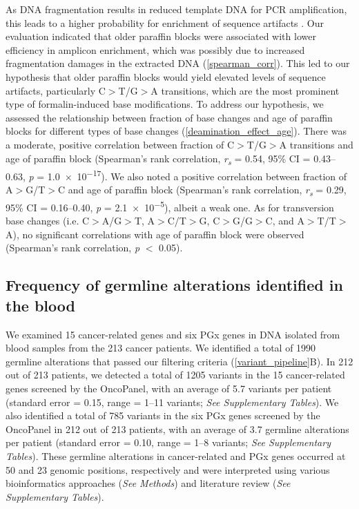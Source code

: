 \documentclass{bmcart}
\begin{document}
As DNA fragmentation results in reduced template DNA for PCR amplification, this leads to a higher probability for enrichment of sequence artifacts \cite{Carrick2015, Wong2014}. Our evaluation indicated that older paraffin blocks were associated with lower efficiency in amplicon enrichment, which was possibly due to increased fragmentation damages in the extracted DNA (\autoref{spearman_corr}). This led to our hypothesis that older paraffin blocks would yield elevated levels of sequence artifacts, particularly C$>$T/G$>$A transitions, which are the most prominent type of formalin-induced base modifications. To address our hypothesis, we assessed the relationship between fraction of base changes and age of paraffin blocks for different types of base changes (\autoref{deamination_effect_age}). There was a moderate, positive correlation between fraction of C$>$T/G$>$A transitions and age of paraffin block (Spearman's rank correlation, \textit{r\textsubscript{s}} = 0.54, 95\% CI = 0.43--0.63, \textit{p} = \num{1.0e-17}). We also noted a positive correlation between fraction of A$>$G/T$>$C and age of paraffin block (Spearman's rank correlation, \textit{r\textsubscript{s}} = 0.29, 95\% CI = 0.16--0.40, \textit{p} = \num{2.1e-5}), albeit a weak one. As for transversion base changes (i.e. C$>$A/G$>$T, A$>$C/T$>$G, C$>$G/G$>$C, and A$>$T/T$>$A), no significant correlations with age of paraffin block were observed (Spearman's rank correlation, \textit{p} $<$ \num{0.05}).

\subsection*{Frequency of germline alterations identified in the blood}

We examined 15 cancer-related genes and six PGx genes in DNA isolated from blood samples from the 213 cancer patients. We identified a total of 1990 germline alterations that passed our filtering criteria (\autoref{variant_pipeline}B). In 212 out of 213 patients, we detected a total of 1205 variants in the 15 cancer-related genes screened by the OncoPanel, with an average of 5.7 variants per patient (standard error = 0.15, range = 1--11 variants; \textit{See Supplementary Tables}). We also identified a total of 785 variants in the six PGx genes screened by the OncoPanel in 212 out of 213 patients, with an average of 3.7 germline alterations per patient (standard error = 0.10, range = 1--8 variants; \textit{See Supplementary Tables}). These germline alterations in cancer-related and PGx genes occurred at 50 and 23 genomic positions, respectively and were interpreted using various bioinformatics approaches (\textit{See Methods}) and literature review (\textit{See Supplementary Tables}).
\end{document}
